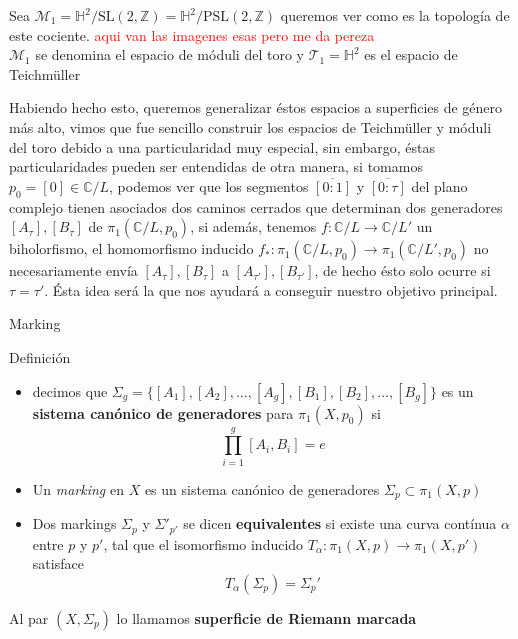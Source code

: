 \documentclass[xcolor=dvipsnames,10pt]{beamer}
\newcommand\Z{\ensuremath{\mathbb{Z}}}
\newcommand\C{\ensuremath{\mathbb{C}}}
\newcommand\Hs{\ensuremath{\mathbb{H}}}
\begin{document}
\begin{frame}
    Sea $\mathcal{M}_1 = \Hs^2/\text{SL}(2,\Z) = \Hs^2/\text{PSL}(2,\Z)$ queremos ver como es la topología de este cociente. \textcolor{red}{aqui van las imagenes esas pero me da pereza}\\ 
    $\mathcal{M}_1$ se denomina el espacio de móduli del toro y $\mathcal{T}_1 = \Hs^2 $ es el espacio de Teichmüller

\end{frame}
\begin{frame}
    Habiendo hecho esto, queremos generalizar éstos espacios a superficies de género más alto, vimos que fue sencillo construir los espacios de Teichmüller y móduli del toro debido a una particularidad muy especial, sin embargo, éstas particularidades pueden ser entendidas de otra manera, si tomamos $p_0 = [0] \in \C /L$, podemos ver que los segmentos $\overline{[0:1]}$ y $\overline{[0:\tau]}$ del plano complejo tienen asociados dos caminos cerrados que determinan dos generadores $[A_\tau],[B_\tau]$ de $\pi_1(\C /L,p_0)$, si además, tenemos $f: \C/L \rightarrow \C/L'$ un biholorfismo, el homomorfismo inducido $f_*: \pi_1(\C/L,p_0) \rightarrow \pi_1(\C/L', p_0)$ no necesariamente envía $[A_\tau],[B_\tau]$ a $[A_{\tau'}],[B_{\tau'}]$, de hecho ésto solo ocurre si $\tau = \tau'$. Ésta idea será la que nos ayudará a conseguir nuestro objetivo principal.  
\end{frame}
\begin{frame}{Marking}
    \begin{block}{Definición}
    \begin{itemize}
        Sea $X$ una superficie de Riemann cerrada género g, 
        \item decimos que 
        $\Sigma_g = \{[A_1],[A_2],\ldots,[A_g],[B_1],[B_2],\ldots, [B_g]\}$ es un \textbf{sistema canónico de generadores} para $\pi_1(X,p_0)$ si
    \[ \prod_{i=1}^g [A_i,B_i] = e \]
        \item Un \textit{marking} en $X$ es un sistema canónico de generadores $\Sigma_p \subset \pi_1(X,p)$
        \item Dos markings $\Sigma_p$ y $\Sigma'_{p'}$ se dicen  \textbf{equivalentes} si existe una curva contínua $\alpha$ entre $p$ y $p'$, tal que el isomorfismo inducido $T_\alpha: \pi_1(X,p) \rightarrow \pi_1(X,p')$ satisface
        \[
        T_\alpha(\Sigma_p) = \Sigma_p'
        \]
    \end{itemize}
    Al par $(X,\Sigma_p)$ lo llamamos \textbf{superficie de Riemann marcada} 
    \end{block}
\end{frame}
\end{document}
